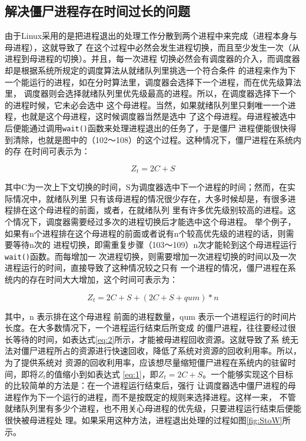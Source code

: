 \documentclass{swfuthesism}
\begin{document}
\subsection{解决僵尸进程存在时间过长的问题}

由于Linux采用的是把进程退出的处理工作分散到两个进程中来完成（进程本身与母进程），这就导致了
在这个过程中必然会发生进程切换，而且至少发生一次（从进程到母进程的切换）。并且，每一次进程
切换必然会有调度器的介入，而调度器却是根据系统所规定的调度算法从就绪队列里挑选一个符合条件
的进程来作为下一个能运行的进程，如在分时算法里，调度器会选择下一个进程，而在优先级算法里，
调度器则会选择就绪队列里优先级最高的进程。所以，在调度器选择下一个的进程时候，它未必会选中
这个母进程。当然，如果就绪队列里只剩唯一一个进程，也就是这个母进程，这时候调度器当然是选中
了这个母进程。母进程被选中后便能通过调用\texttt{wait()}函数来处理进程退出的任务了，于是僵尸
进程便能很快得到清除，也就是图中的（102～108）的这个过程。这种情况下，僵尸进程在系统内的存
在时间可表示为：

\begin{equation}
  \label{eq:1}
  Z_t=2C+S
\end{equation}

其中C为一次上下文切换的时间，S为调度器选中下一个进程的时间；然而，在实际情况中，就绪队列里
只有该母进程的情况很少存在，大多时候却是，有很多进程排在这个母进程的前面，或者，在就绪队列
里有许多优先级别较高的进程。这个情况下，调度器需要经过多次的进程切换后才能选中这个母进程。
举个例子，如果有n个进程排在这个母进程的前面或者说有n个较高优先级的进程的话，则需要等待n次的
进程切换，即需重复步骤（103～109）n次才能轮到这个母进程运行\texttt{wait()}函数。而每增加一
次进程切换，则需要增加一次进程切换的时间以及一次进程运行的时间，直接导致了这种情况较之只有
一个进程的情况，僵尸进程在系统内的存在时间大大增加，这个时间可表示为：

\begin{equation}
  \label{eq:2}
  Z_t=2C+S+(2C+S+qum)*n
\end{equation}

其中，n 表示排在这个母进程
前面的进程数量，qum 表示一个进程运行的时间片长度。在大多数情况下，一个进程运行结束后所变成
的僵尸进程，往往要经过很长等待的时间，如表达式\ref{eq:2}所示，才能被母进程回收资源。这就导致了系
统无法对僵尸进程所占的资源进行快速回收，降低了系统对资源的回收利用率。所以，为了提供系统对
资源的回收利用率，应该想尽量缩短僵尸进程在系统内的驻留时间，即将$Z_t$的值缩小到如表达式
\ref{eq:1}，即$Z_t=2C+S$。一个能够实现这个目标的比较简单的方法是：在一个进程运行结束后，强行
让调度器选中僵尸进程的母进程作为下一个运行的进程，而不是按既定的规则来选择进程。这样一来，
不管就绪队列里有多少个进程，也不用关心母进程的优先级，只要进程运行结束后便能很快被母进程处
理。如果采用这种方法，进程退出处理的过程如图\ref{fig:StoW}所示。
\end{document}
